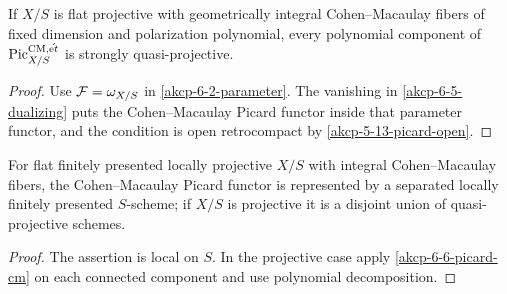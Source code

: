 \begin{theorem}
\label{akcp-6-6-picard-cm}
If $X/S$ is flat projective with geometrically integral Cohen--Macaulay fibers
of fixed dimension and polarization polynomial, every polynomial component of
$\operatorname{Pic}^{\mathrm{CM},\acute{\mathrm et}}_{X/S}$ is strongly quasi-projective.
\end{theorem}
\begin{proof}
Use $\mathcal F=\omega_{X/S}$ in \cref{akcp-6-2-parameter}.  The vanishing in
\cref{akcp-6-5-dualizing} puts the Cohen--Macaulay Picard functor inside that
parameter functor, and the condition is open retrocompact by
\cref{akcp-5-13-picard-open}.
\end{proof}

\begin{corollary}
\label{akcp-6-7-picard-cm-local}
For flat finitely presented locally projective $X/S$ with integral
Cohen--Macaulay fibers, the Cohen--Macaulay Picard functor is represented by a
separated locally finitely presented $S$-scheme; if $X/S$ is projective it is a
disjoint union of quasi-projective schemes.
\end{corollary}
\begin{proof}
The assertion is local on $S$.  In the projective case apply
\cref{akcp-6-6-picard-cm} on each connected component and use polynomial
decomposition.
\end{proof}
